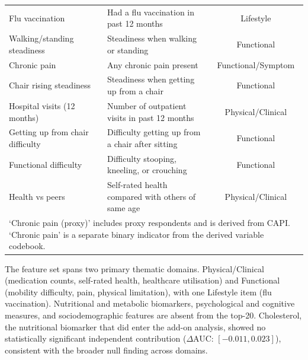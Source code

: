\begin{table}[ht]
{\begin{tabular}{llc}
Flu vaccination & Had a flu vaccination in past 12 months & Lifestyle \\
Walking/standing steadiness & Steadiness when walking or standing & Functional \\
Chronic pain & Any chronic pain present & Functional/Symptom \\
Chair rising steadiness & Steadiness when getting up from a chair & Functional \\
Hospital visits (12 months) & Number of outpatient visits in past 12 months & Physical/Clinical \\
Getting up from chair difficulty & Difficulty getting up from a chair after sitting & Functional \\
Functional difficulty & Difficulty stooping, kneeling, or crouching & Functional \\
Health vs peers & Self-rated health compared with others of same age & Physical/Clinical \\
\bottomrule
\multicolumn{3}{l}{\footnotesize `Chronic pain (proxy)' includes proxy respondents and is derived from \gls{CAPI}. `Chronic pain' is a separate binary indicator from the derived variable codebook.} \\
\end{tabular}
}
\end{table}

The feature set spans two primary thematic domains. Physical/Clinical (medication counts, self-rated health, healthcare utilisation) and Functional (mobility difficulty, pain, physical limitation), with one Lifestyle item (flu vaccination). Nutritional and metabolic biomarkers, psychological and cognitive measures, and sociodemographic features are absent from the top-20. Cholesterol, the nutritional biomarker that did enter the add-on analysis, showed no statistically significant independent contribution ($\Delta$\gls{AUC}: $[-0.011, 0.023]$), consistent with the broader null finding across domains.

